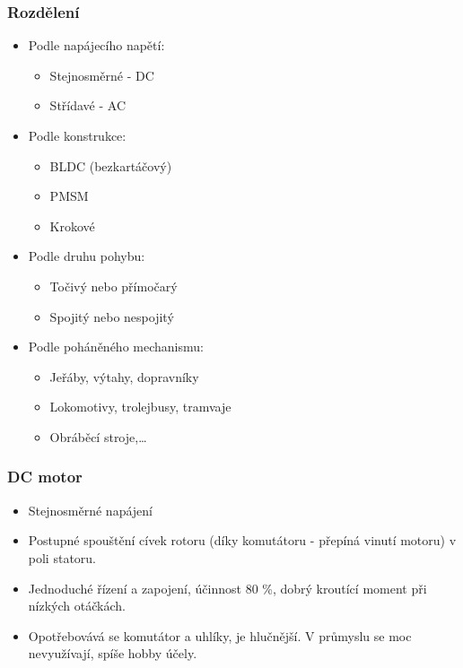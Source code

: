 \subsubsection*{Rozdělení}
\begin{itemize}
    \item Podle napájecího napětí: \begin{itemize}
              \item Stejnosměrné - DC
              \item Střídavé - AC
          \end{itemize}
    \item Podle konstrukce: \begin{itemize}
              \item BLDC (bezkartáčový)
              \item PMSM
              \item Krokové
          \end{itemize}
    \item Podle druhu pohybu: \begin{itemize}
              \item Točivý nebo přímočarý
              \item Spojitý nebo nespojitý
          \end{itemize}
    \item Podle poháněného mechanismu: \begin{itemize}
              \item Jeřáby, výtahy, dopravníky
              \item Lokomotivy, trolejbusy, tramvaje
              \item Obráběcí stroje,\dots
          \end{itemize}
\end{itemize}

\subsubsection*{DC motor}
\begin{itemize}
    \item Stejnosměrné napájení
    \item Postupné spouštění cívek rotoru (díky komutátoru - přepíná vinutí motoru) v poli statoru.
    \item Jednoduché řízení a zapojení, účinnost 80 \%, dobrý kroutící moment při nízkých otáčkách.
    \item Opotřebovává se komutátor a uhlíky, je hlučnější. V průmyslu se moc nevyužívají, spíše hobby účely.
\end{itemize}


